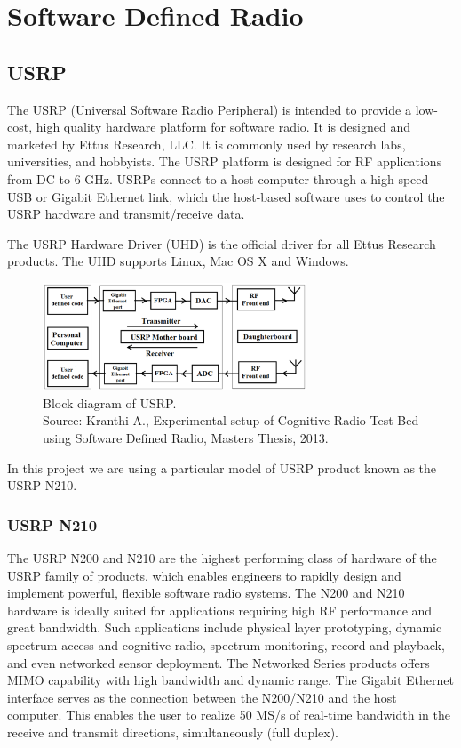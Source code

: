 \chapter{Software Defined Radio}



\section{USRP}

The USRP (Universal Software Radio Peripheral) is intended to provide a 
low-cost, high quality hardware platform for software radio. It is designed
and marketed by Ettus Research, LLC. It is commonly used by research labs,
universities, and hobbyists. The USRP platform is designed for RF applications
from DC to 6 GHz. USRPs connect to a host computer through a high-speed USB or
Gigabit Ethernet link, which the host-based software uses to control the USRP
hardware and transmit/receive data.

The USRP Hardware Driver (UHD) is the official driver for all Ettus Research
products. The UHD supports Linux, Mac OS X and Windows.

\begin{figure}
\centering
\includegraphics[width=0.7\textwidth]{usrpBlock}
\caption[Block diagram of USRP]{Block diagram of USRP.\\
\footnotesize{Source: Kranthi A., Experimental setup of Cognitive Radio 
Test-Bed using Software Defined Radio, Masters Thesis, 2013.}}
\label{usrpBlock}
\end{figure}

In this project we are using a particular model of USRP product known as the
USRP N210.

\subsection{USRP N210}

The USRP N200 and N210 are the highest performing class of hardware of the 
USRP family of products, which enables engineers to rapidly design and 
implement powerful, flexible software radio systems. The N200 and N210 
hardware is ideally suited for applications requiring high RF performance and
great bandwidth. Such applications include physical layer prototyping, dynamic
spectrum access and cognitive radio, spectrum monitoring, record and playback,
and even networked sensor deployment. The Networked Series products offers 
MIMO capability with high bandwidth and dynamic range. The Gigabit Ethernet
interface serves as the connection between the N200/N210 and the host 
computer. This enables the user to realize 50 MS/s of real-time bandwidth in 
the receive and transmit directions, simultaneously (full duplex).



